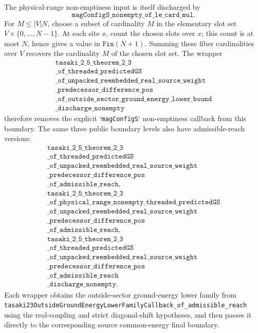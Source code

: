 \documentclass[a4paper,11pt]{article}
\begin{document}
The physical-range non-emptiness input is itself discharged by
\[
  \texttt{magConfigS\_nonempty\_of\_le\_card\_mul}.
\]
For \(M\le |V|N\), choose a subset of cardinality \(M\) in the
elementary slot set \(V\times\{0,\ldots,N-1\}\).  At each site \(x\),
count the chosen slots over \(x\); this count is at most \(N\), hence
gives a value in \(\texttt{Fin}(N+1)\).  Summing these fiber
cardinalities over \(V\) recovers the cardinality \(M\) of the chosen
slot set.  The wrapper
\[
\begin{gathered}
\texttt{tasaki\_2\_5\_theorem\_2\_3}\\
\texttt{\_of\_threaded\_predictedGS}\\
\texttt{\_of\_unpacked\_reembedded\_real\_source\_weight}\\
\texttt{\_predecessor\_difference\_pos}\\
\texttt{\_of\_outside\_sector\_ground\_energy\_lower\_bound}\\
\texttt{\_discharge\_nonempty}
\end{gathered}
\]
therefore removes the explicit `\texttt{magConfigS}` non-emptiness
callback from this boundary.
The same three public boundary levels also have admissible-reach versions:
\[
\begin{gathered}
\texttt{tasaki\_2\_5\_theorem\_2\_3}\\
\texttt{\_of\_threaded\_predictedGS}\\
\texttt{\_of\_unpacked\_reembedded\_real\_source\_weight}\\
\texttt{\_predecessor\_difference\_pos}\\
\texttt{\_of\_admissible\_reach},\\
\texttt{tasaki\_2\_5\_theorem\_2\_3}\\
\texttt{\_of\_physical\_range\_nonempty\_threaded\_predictedGS}\\
\texttt{\_of\_unpacked\_reembedded\_real\_source\_weight}\\
\texttt{\_predecessor\_difference\_pos}\\
\texttt{\_of\_admissible\_reach},\\
\texttt{tasaki\_2\_5\_theorem\_2\_3}\\
\texttt{\_of\_threaded\_predictedGS}\\
\texttt{\_of\_unpacked\_reembedded\_real\_source\_weight}\\
\texttt{\_predecessor\_difference\_pos}\\
\texttt{\_of\_admissible\_reach}\\
\texttt{\_discharge\_nonempty}.
\end{gathered}
\]
Each wrapper obtains the outside-sector ground-energy lower family from
\texttt{tasaki23OutsideGroundEnergyLowerFamilyCallback\_of\_admissible\_reach}
using the real-coupling and strict diagonal-shift hypotheses, and then
passes it directly to the corresponding source common-energy final boundary.
\end{document}
